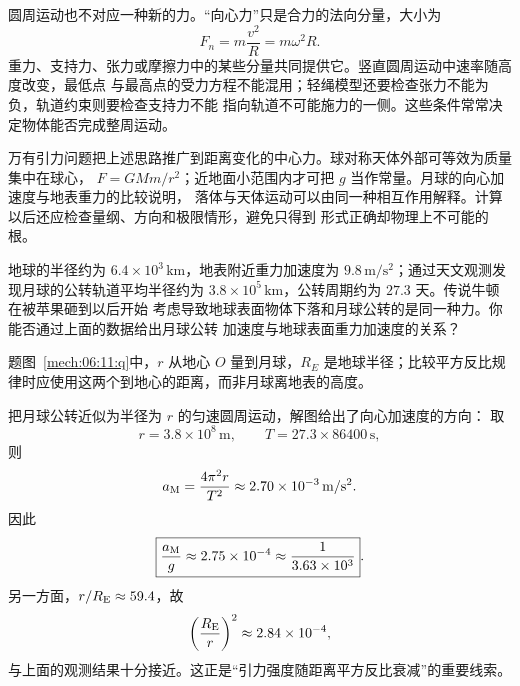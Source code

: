 {圆周运动也不对应一种新的力。“向心力”只是合力的法向分量，大小为
\begin{equation}
 F_n=m\frac{v^2}{R}=m\omega^2R.
\end{equation}
重力、支持力、张力或摩擦力中的某些分量共同提供它。竖直圆周运动中速率随高度改变，最低点
与最高点的受力方程不能混用；轻绳模型还要检查张力不能为负，轨道约束则要检查支持力不能
指向轨道不可能施力的一侧。这些条件常常决定物体能否完成整周运动。

万有引力问题把上述思路推广到距离变化的中心力。球对称天体外部可等效为质量集中在球心，
$F=GMm/r^2$；近地面小范围内才可把 $g$ 当作常量。月球的向心加速度与地表重力的比较说明，
落体与天体运动可以由同一种相互作用解释。计算以后还应检查量纲、方向和极限情形，避免只得到
形式正确却物理上不可能的根。


\begin{origexamplebox}{}\label{ch06:ex:s05-2-11}
地球的半径约为 $6.4\times10^3\,\mathrm{km}$，地表附近重力加速度为
$9.8\,\mathrm{m/s^2}$；通过天文观测发现月球的公转轨道平均半径约为
$3.8\times10^5\,\mathrm{km}$，公转周期约为 $27.3$ 天。传说牛顿在被苹果砸到以后开始
考虑导致地球表面物体下落和月球公转的是同一种力。你能否通过上面的数据给出月球公转
加速度与地球表面重力加速度的关系？

\begin{qualityfigure}
\label{mech:06:11:q}
\end{qualityfigure}
\end{origexamplebox}

\begin{xesolution}题图~\ref{mech:06:11:q}中，$r$ 从地心 $O$ 量到月球，$R_E$ 是地球半径；比较平方反比规律时应使用这两个到地心的距离，而非月球离地表的高度。

把月球公转近似为半径为 $r$ 的匀速圆周运动，解图给出了向心加速度的方向：
\soldiagTwoEleven
取
\[
 r=3.8\times10^8\,\mathrm m,
 \qquad
 T=27.3\times86400\,\mathrm s,
\]
则
\[
 a_{\rm M}=\frac{4\pi^2r}{T^2}
 \approx2.70\times10^{-3}\,\mathrm{m/s^2}.
\]
因此
\[
 \boxed{\frac{a_{\rm M}}{g}\approx2.75\times10^{-4}
 \approx\frac1{3.63\times10^3}}.
\]
另一方面，$r/R_{\rm E}\approx59.4$，故
\[
 \left(\frac{R_{\rm E}}r\right)^2\approx2.84\times10^{-4},
\]
与上面的观测结果十分接近。这正是“引力强度随距离平方反比衰减”的重要线索。
\end{xesolution}

}
